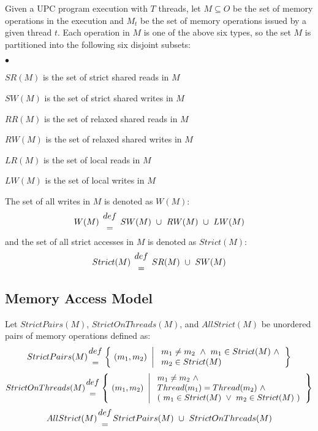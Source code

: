 \documentclass[12pt,titlepage]{article}
\newcounter{parnum}
\newcommand\np{\addtocounter{parnum}{1}\hspace{-2em}\makebox[2em][l]{\arabic{parnum}}}
\begin{document}
\np Given a UPC program execution with $T$ threads, let $M \subseteq O$ be
the set of memory operations in the execution and $M_t$ be the
set of memory operations issued by a given thread $t$.  Each operation
in $M$ is one of the above six types, so the set $M$ is 
partitioned into the following six disjoint subsets:
\begin{list}{ $\bullet$ }{\setlength{\itemsep}{0pt}}
\item $SR(M)$ is the set of strict shared reads in $M$
\item $SW(M)$ is the set of strict shared writes in $M$
\item $RR(M)$ is the set of relaxed shared reads in $M$
\item $RW(M)$ is the set of relaxed shared writes in $M$
\item $LR(M)$ is the set of local reads in $M$
\item $LW(M)$ is the set of local writes in $M$
\end{list}

\np The set of all writes in $M$ is denoted as $W(M)$:
\begin{eqnarray*}
W(M)\ {def \atop =}\ SW(M)\ \cup\ RW(M)\ \cup\ LW(M)
\end{eqnarray*}
and the set of all strict accesses in $M$ is denoted as $Strict(M)$:
\begin{eqnarray*}
Strict(M)\ {def \atop =}\ SR(M)\ \cup\ SW(M)
\end{eqnarray*}

\subsection{Memory Access Model}
\label{MemoryAccessModel}
\np Let $StrictPairs(M)$, $StrictOnThreads(M)$, and $AllStrict(M)$
be unordered pairs of memory operations defined as:
\[
StrictPairs(M) {def \atop =} \left\{\ (m_1, m_2)\ \left|\ 
\begin{array}{l} m_1 \neq m_2\ \land\ m_1 \in Strict(M)\ \land \\
                 m_2 \in Strict(M)\ \end{array} \right. \right\} 
\]
\[
StrictOnThreads(M) {def \atop =} \left\{\ (m_1, m_2)\ \left|\ 
\begin{array}{l} m_1 \neq m_2\ \land\ \\ Thread(m_1) = Thread(m_2)\ \land \\ 
                 (\ m_1 \in Strict(M)\ \lor\ m_2 \in Strict(M)\ ) \end{array} \right. \right\} 
\]
\[
AllStrict(M) {def \atop =} StrictPairs(M)\ \cup\ StrictOnThreads(M)
\]
\end{document}

